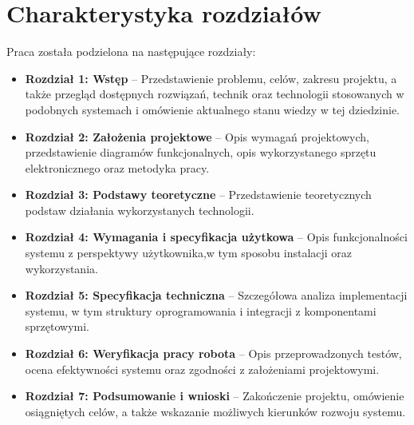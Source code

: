 \section{Charakterystyka rozdziałów}
\label{sec:charakterystyka}

Praca została podzielona na następujące rozdziały:

\begin{itemize}
    \item \textbf{Rozdział 1: Wstęp} – Przedstawienie problemu, celów, zakresu projektu, a także przegląd dostępnych rozwiązań, technik oraz technologii stosowanych w podobnych systemach i omówienie aktualnego stanu wiedzy w tej dziedzinie.
    \item \textbf{Rozdział 2: Założenia projektowe} – Opis wymagań projektowych, przedstawienie diagramów funkcjonalnych, opis wykorzystanego sprzętu elektronicznego oraz metodyka pracy. 
    \item \textbf{Rozdział 3: Podstawy teoretyczne} – Przedstawienie teoretycznych podstaw działania wykorzystanych technologii. 
    \item \textbf{Rozdział 4: Wymagania i specyfikacja użytkowa} – Opis funkcjonalności systemu z perspektywy użytkownika,w tym sposobu instalacji oraz wykorzystania. 
    \item \textbf{Rozdział 5: Specyfikacja techniczna} – Szczegółowa analiza implementacji systemu, w tym struktury oprogramowania i integracji z komponentami sprzętowymi.
    \item \textbf{Rozdział 6: Weryfikacja pracy robota} – Opis przeprowadzonych testów, ocena efektywności systemu oraz zgodności z założeniami projektowymi.
    \item \textbf{Rozdział 7: Podsumowanie i wnioski} – Zakończenie projektu, omówienie osiągniętych celów, a także wskazanie możliwych kierunków rozwoju systemu.
\end{itemize}



